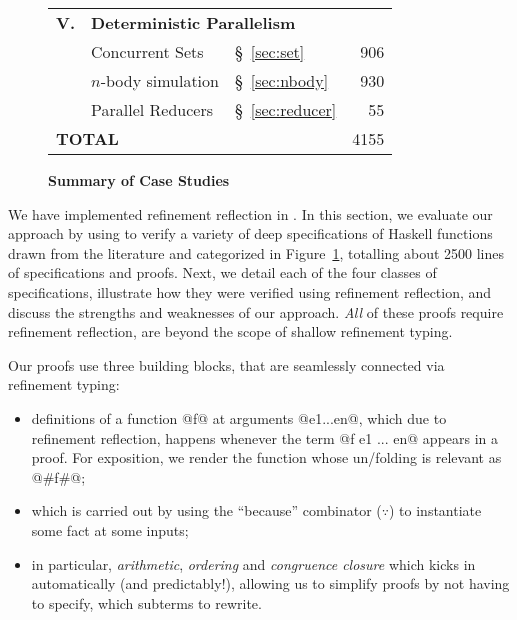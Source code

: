 \begin{figure}[t!]
\begin{center}
\begin{tabular}{lllr}
  \midrule

  \textbf{V.} & \multicolumn{3}{l}{\textbf{Deterministic Parallelism}} \\[0.05in]
  & Concurrent Sets     & \S~\ref{sec:set}           & 906 \\ %
  & $n$-body simulation & \S~\ref{sec:nbody}         & 930 \\ %
  & Parallel Reducers   & \S~\ref{sec:reducer}       &  55 \\ %

  \midrule

  \multicolumn{3}{l}{\textbf{TOTAL}}                 & 4155 \\
\bottomrule
\end{tabular}
\end{center}
\caption{\textbf{Summary of Case Studies}}
\label{fig:eval-summary}
\end{figure}

We have implemented refinement reflection
in \toolname. 
%
In this section, we evaluate our approach
by using \toolname to verify a variety of
deep specifications of Haskell functions
drawn from the literature and categorized
in Figure~\ref{fig:eval-summary},
totalling about 2500 lines of specifications
and proofs.
%
Next, we detail each of the four classes of
specifications, illustrate how they were
verified using refinement reflection, and
discuss the strengths and weaknesses of
our approach.
%
\emph{All} of these proofs require refinement
reflection, \ie are beyond the scope of shallow
refinement typing.

%
Our proofs use three building blocks, that are seamlessly
connected via refinement typing:
%
\begin{itemize}
  \item {}
     definitions of a function @f@ at
     arguments @e1...en@, which due
     to refinement reflection, happens
     whenever the term @f e1 ... en@
     appears in a proof.
     For exposition, we render the function
     whose un/folding is relevant as @#f#@;

  \item {}
     which is carried out by using
     the ``because'' combinator
     ($\because$) to instantiate
     some fact at some inputs;

  \item {}
     in particular, \emph{arithmetic},
     \emph{ordering} and \emph{congruence closure}
     which kicks in automatically (and predictably!),
     allowing us to simplify proofs by not
     having to specify, \eg which subterms
     to rewrite.
\end{itemize}

